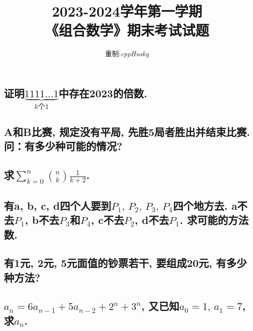 \documentclass[12pt]{ctexart}
\title{2023-2024学年第一学期\\《组合数学》期末考试试题}
\author{重制:\textit{cppHusky}}
\date{}
\begin{document}
\pagestyle{fancy}
\fancyhf{}
\maketitle
\thispagestyle{fancy}

\subsection{证明\(\underbrace{1111\dots1}_{k\text{个}1}\)中存在2023的倍数.}
\subsection{A和B比赛, 规定没有平局, 先胜5局者胜出并结束比赛. 问：有多少种可能的情况?}
\subsection{求\(\sum_{k=0}^{n}\binom{n}{k}\frac{1}{k+2}\).}
\subsection{有a, b, c, d四个人要到\(P_1,\,P_2,\,P_3,\,P_4\)四个地方去. a不去\(P_1\), b不去\(P_3\)和\(P_4\), c不去\(P_2\), d不去\(P_1\). 求可能的方法数.}
\subsection{有1元, 2元, 5元面值的钞票若干, 要组成20元, 有多少种方法?}
\subsection{\(a_{n}=6a_{n-1}+5a_{n-2}+2^{n}+3^{n}\), 又已知\(a_{0}=1,\,a_{1}=7\), 求\(a_{n}\).}
\end{document}

